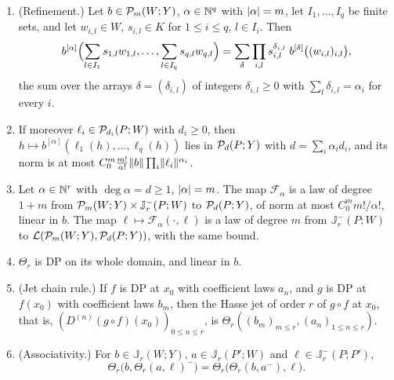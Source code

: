 \begin{lemma}\label{dp:lem:chain-law}
\leavevmode
\begin{enumerate}
\item \textup{(Refinement.)} Let $b\in\mathcal P_m(W;Y)$, $\alpha\in\mathbb N^q$ with $\lvert \alpha\rvert=m$, let $I_1,\dots,I_q$ be finite sets, and let $w_{i,l}\in W$, $s_{i,l}\in K$ for $1\le i\le q$, $l\in I_i$. Then
\begin{equation}\label{dp:13:eq:refine}
 b^{[\alpha]}\Bigl(\sum_{l\in I_1}s_{1,l}w_{1,l},\dots,\sum_{l\in I_q}s_{q,l}w_{q,l}\Bigr)=\sum_\delta\prod_{i,l}s_{i,l}^{\delta_{i,l}}\;b^{[\delta]}\bigl((w_{i,l})_{i,l}\bigr),
\end{equation}
the sum over the arrays $\delta=(\delta_{i,l})$ of integers $\delta_{i,l}\ge0$ with $\sum_l\delta_{i,l}=\alpha_i$ for every $i$.
\item If moreover $\ell_i\in\mathcal P_{d_i}(P;W)$ with $d_i\ge0$, then $h\mapsto b^{[\alpha]}(\ell_1(h),\dots,\ell_q(h))$ lies in $\mathcal P_d(P;Y)$ with $d=\sum_i\alpha_id_i$, and its norm is at most $C_0^m\frac{m!}{\alpha!}\lVert b\rVert\prod_i\lVert \ell_i\rVert^{\alpha_i}$.
\item Let $\alpha\in\mathbb N^r$ with $\deg\alpha=d\ge1$, $\lvert \alpha\rvert=m$. The map $\mathcal F_\alpha$ is a law of degree $1+m$ from $\mathcal P_m(W;Y)\times\mathbb J^-_r(P;W)$ to $\mathcal P_d(P;Y)$, of norm at most $C_0^mm!/\alpha!$, linear in $b$. The map $\ell\mapsto\mathcal F_\alpha({\cdot},\ell)$ is a law of degree $m$ from $\mathbb J^-_r(P;W)$ to $\mathcal L(\mathcal P_m(W;Y),\mathcal P_d(P;Y))$, with the same bound.
\item $\Theta_r$ is DP on its whole domain, and linear in $b$.
\item \textup{(Jet chain rule.)} If $f$ is DP at $x_0$ with coefficient laws $a_n$, and $g$ is DP at $f(x_0)$ with coefficient laws $b_m$, then the Hasse jet of order $r$ of $g\circ f$ at $x_0$, that is, $(D^{(n)}(g\circ f)(x_0))_{0\le n\le r}$, is $\Theta_r((b_m)_{m\le r},(a_n)_{1\le n\le r})$.
\item \textup{(Associativity.)} For $b\in\mathbb J_r(W;Y)$, $a\in\mathbb J_r(P';W)$ and $\ell\in\mathbb J^-_r(P;P')$,
\[
 \Theta_r\bigl(b,\Theta_r(a,\ell)^-\bigr)=\Theta_r\bigl(\Theta_r(b,a^-),\ell\bigr).
\]
\end{enumerate}
\end{lemma}

